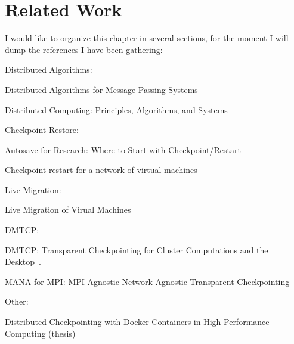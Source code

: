 \chapter{Related Work} \label{chap:related-work}

I would like to organize this chapter in several sections, for the moment I will dump the references I have been gathering:

Distributed Algorithms:

Distributed Algorithms for Message-Passing Systems~\cite{Raynal2013}

Distributed Computing: Principles, Algorithms, and Systems~\cite{Kshemkalyani2008}

Checkpoint Restore:

Autosave for Research: Where to Start with Checkpoint/Restart~\cite{Barker2014}

Checkpoint-restart for a network of virtual machines~\cite{Garg2013}

Live Migration:

Live Migration of Virual Machines~\cite{Clark2005}

DMTCP:

DMTCP: Transparent Checkpointing for Cluster Computations and the Desktop~\cite{Ansel2009}.

MANA for MPI: MPI-Agnostic Network-Agnostic Transparent Checkpointing~\cite{Garg2019}

Other:

Distributed Checkpointing with Docker Containers in High Performance Computing (thesis)~\cite{Berg2017}

